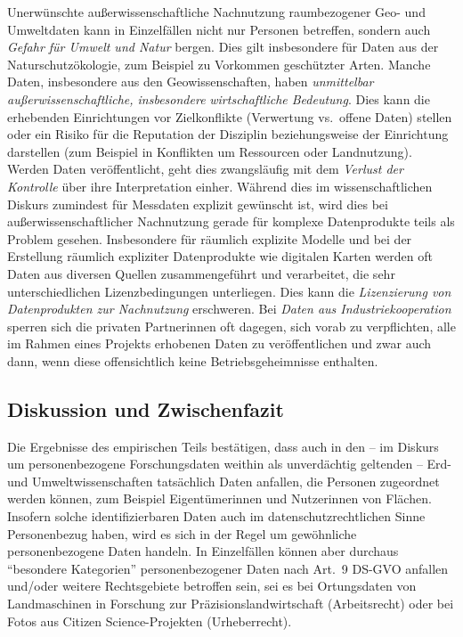 \documentclass[a4paper,
fontsize=11pt,
oneside,
numbers=noperiodatend,
parskip=half-,
bibliography=totoc,
final
]{scrartcl}
\begin{document}
Unerwünschte außerwissenschaftliche Nachnutzung raumbezogener Geo- und
Umweltdaten kann in Einzelfällen nicht nur Personen betreffen, sondern
auch \emph{Gefahr für Umwelt und Natur} bergen. Dies gilt insbesondere
für Daten aus der Naturschutzökologie, zum Beispiel zu Vorkommen
geschützter Arten. Manche Daten, insbesondere aus den Geowissenschaften,
haben \emph{unmittelbar außerwissenschaftliche, insbesondere}
\emph{wirtschaftliche Bedeutung}. Dies kann die erhebenden Einrichtungen
vor Zielkonflikte (Verwertung vs.~offene Daten) stellen oder ein Risiko
für die Reputation der Disziplin beziehungsweise der Einrichtung
darstellen (zum Beispiel in Konflikten um Ressourcen oder Landnutzung).
Werden Daten veröffentlicht, geht dies zwangsläufig mit dem
\emph{Verlust der Kontrolle} über ihre Interpretation einher. Während
dies im wissenschaftlichen Diskurs zumindest für Messdaten explizit
gewünscht ist, wird dies bei außerwissenschaftlicher Nachnutzung gerade
für komplexe Datenprodukte teils als Problem gesehen. Insbesondere für
räumlich explizite Modelle und bei der Erstellung räumlich expliziter
Datenprodukte wie digitalen Karten werden oft Daten aus diversen Quellen
zusammengeführt und verarbeitet, die sehr unterschiedlichen
Lizenzbedingungen unterliegen. Dies kann die \emph{Lizenzierung von
Datenprodukten zur Nachnutzung} erschweren. Bei \emph{Daten aus
Industriekooperation} sperren sich die privaten Partnerinnen oft
dagegen, sich vorab zu verpflichten, alle im Rahmen eines Projekts
erhobenen Daten zu veröffentlichen und zwar auch dann, wenn diese
offensichtlich keine Betriebsgeheimnisse enthalten.

\hypertarget{diskussion-und-zwischenfazit-1}{%
\subsection{Diskussion und Zwischenfazit}\label{diskussion-und-zwischenfazit-1}}

Die Ergebnisse des empirischen Teils bestätigen, dass auch in den -- im
Diskurs um personenbezogene Forschungsdaten weithin als unverdächtig
geltenden -- Erd- und Umweltwissenschaften tatsächlich Daten anfallen,
die Personen zugeordnet werden können, zum Beispiel Eigentümerinnen und
Nutzerinnen von Flächen. Insofern solche identifizierbaren Daten auch im
datenschutzrechtlichen Sinne Personenbezug haben, wird es sich in der
Regel um gewöhnliche personenbezogene Daten handeln. In Einzelfällen
können aber durchaus \enquote{besondere Kategorien} personenbezogener
Daten nach Art.~9 DS-GVO anfallen und/oder weitere Rechtsgebiete
betroffen sein, sei es bei Ortungsdaten von Landmaschinen in Forschung
zur Präzisionslandwirtschaft (Arbeitsrecht) oder bei Fotos aus Citizen
Science-Projekten (Urheberrecht).
\end{document}
